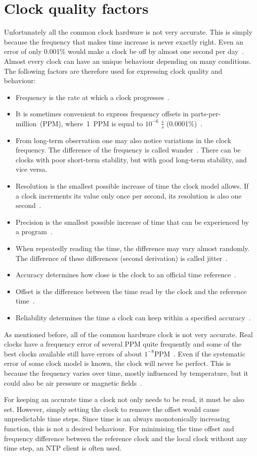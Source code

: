 \section{Clock quality factors}
Unfortunately all the common clock hardware is not very accurate.
This is simply because the frequency that makes time increase is never exactly right.
Even an error of only 0.001\% would make a clock be off by almost one second per day~\cite{ntp-faq}.
Almost every clock can have an unique behaviour depending on many conditions.
The following factors are therefore used for expressing clock quality and behaviour:
\begin{itemize}
\item
Frequency is the rate at which a clock progresses~\cite{thesis-sync}.
\item
It is sometimes convenient
to express frequency offsets in parts-per-million~(PPM), where~1~PPM
is equal to $10^{-6}$ $\frac{s}{s}$ (0.0001\%)~\cite{rfc5905}.
\item
From long-term observation one may also notice variations in the clock frequency.
The difference of the frequency is called wander~\cite{ntp-faq}.
There can be clocks with poor short-term stability, but with good long-term stability, and vice versa.
\item
Resolution is the smallest possible increase of time the clock model allows.
If a clock increments its value only once per second, its resolution is also one second~\cite{ntp-faq}.
\item
Precision is the smallest possible increase of time that can be experienced
by a program~\cite{ntp-faq}.
\item
When repeatedly reading the time, the difference may vary almost randomly.
The difference of these differences (second derivation) is called jitter~\cite{ntp-faq}.
\item
Accuracy determines how close is the clock to an official time reference~\cite{ntp-faq}.
\item
Offset is the difference between the time read by the clock and the reference time~\cite{thesis-sync}.
\item
Reliability determines the time a clock can keep within a specified accuracy~\cite{ntp-faq}.
\end{itemize}

As mentioned before, all of the common hardware clock is not very accurate.
Real clocks have a frequency error of several PPM quite frequently
and some of the best clocks available still have errors of about $1^{-8}$PPM~\cite{ntp-faq}.
Even if the systematic error of some clock model is known, the clock will never be perfect.
This is because the frequency varies over time, mostly influenced by temperature,
but it could also be air pressure or magnetic fields~\cite{ntp-faq}.

For keeping an accurate time a clock not only needs to be read, it must be also set.
However, simply setting the clock to remove the offset would cause unpredictable time steps.
Since time is an always monotonically increasing function, this is not a desired behaviour.
For minimising the time offset and frequency difference between
the reference clock and the local clock without any time step,
an NTP client is often used.
